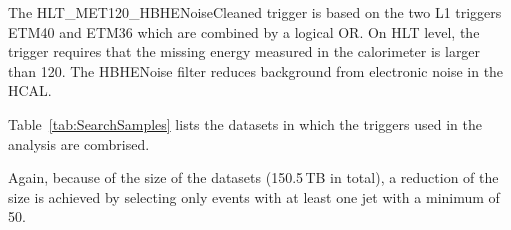 The HLT\_MET120\_HBHENoiseCleaned trigger is based on the two L1 triggers ETM40 and ETM36 which are combined by a logical OR.
On HLT level, the trigger requires that the missing energy measured in the calorimeter is larger than 120\gev.
The HBHENoise filter reduces background from electronic noise in the HCAL.

Table~\ref{tab:SearchSamples} lists the datasets in which the triggers used in the analysis are combrised. 
\renewcommand{\arraystretch}{1.5}
\begin{table}[!h]
\centering
\caption{MET data samples used in the search with the contained intgrated luminosity.}
\label{tab:SearchSamples}
\end{table}  
Again, because of the size of the datasets (150.5\,TB in total), a reduction of the size is achieved by selecting only events with at least one jet with a minimum \pt of 50\gev.\\

